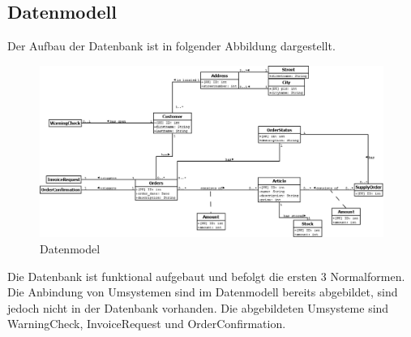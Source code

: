 \subsection{Datenmodell}
Der Aufbau der Datenbank ist in folgender Abbildung dargestellt.
\begin{figure}[H]
	\includegraphics[width=1.0\linewidth]{Images/datamodel}
	\caption{Datenmodel}
	\label{fig:datamodel}
\end{figure}
Die Datenbank ist funktional aufgebaut und befolgt die ersten 3 Normalformen. Die Anbindung von Umsystemen sind im Datenmodell bereits abgebildet, sind jedoch nicht in der Datenbank vorhanden. Die abgebildeten Umsysteme sind WarningCheck, InvoiceRequest und OrderConfirmation.

\clearpage
